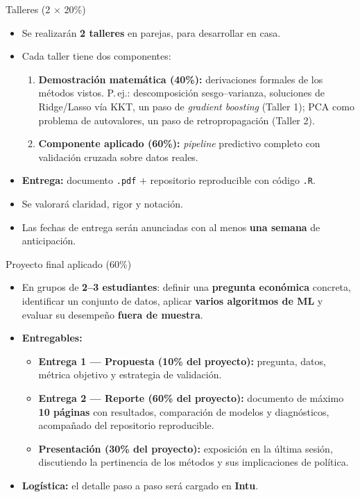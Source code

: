 \documentclass{beamer}
\newcommand{\1}{\mathbb{I}}
\begin{document}
\begin{frame}{Talleres (2 $\times$ 20\%)}
\begin{itemize}\itemsep5pt
    \item Se realizarán \textbf{2 talleres} en parejas, para desarrollar en casa.
    \item Cada taller tiene dos componentes:
    \begin{enumerate}\itemsep3pt
        \item \textbf{Demostración matemática (40\%):} derivaciones formales de los métodos vistos. P.\,ej.: descomposición sesgo--varianza, soluciones de Ridge/Lasso vía KKT, un paso de \emph{gradient boosting} (Taller 1); PCA como problema de autovalores, un paso de retropropagación (Taller 2).
        \item \textbf{Componente aplicado (60\%):} \emph{pipeline} predictivo completo con validación cruzada sobre datos reales.
    \end{enumerate}
    \item \textbf{Entrega:} documento \texttt{.pdf} $+$ repositorio reproducible con código \texttt{.R}.
    \item Se valorará claridad, rigor y notación.
    \item Las fechas de entrega serán anunciadas con al menos \textbf{una semana} de anticipación.
\end{itemize}
\end{frame}

\begin{frame}{Proyecto final aplicado (60\%)}
\small
\begin{itemize}\itemsep4pt
    \item En grupos de \textbf{2--3 estudiantes}: definir una \textbf{pregunta económica} concreta, identificar un conjunto de datos, aplicar \textbf{varios algoritmos de ML} y evaluar su desempeño \textbf{fuera de muestra}.
    \item \textbf{Entregables:}
    \begin{itemize}\itemsep3pt
        \item \textbf{Entrega 1 --- Propuesta (10\% del proyecto):} pregunta, datos, métrica objetivo y estrategia de validación.
        \item \textbf{Entrega 2 --- Reporte (60\% del proyecto):} documento de máximo \textbf{10 páginas} con resultados, comparación de modelos y diagnósticos, acompañado del repositorio reproducible.
        \item \textbf{Presentación (30\% del proyecto):} exposición en la última sesión, discutiendo la pertinencia de los métodos y sus implicaciones de política.
    \end{itemize}
    \item \textbf{Logística:} el detalle paso a paso será cargado en \textbf{Intu}.
\end{itemize}
\end{frame}
\end{document}

